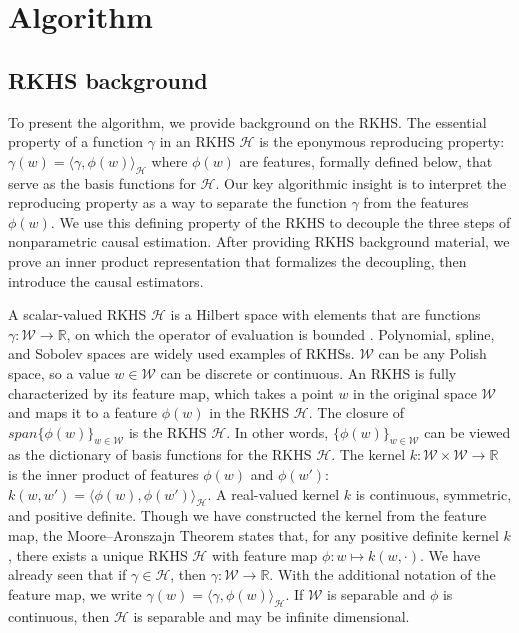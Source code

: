\section{Algorithm}\label{sec:algorithm}

\subsection{RKHS background}

To present the algorithm, we provide background on the RKHS. The essential property of a function $\gamma$ in an RKHS $\mathcal{H}$ is the eponymous reproducing property: $\gamma(w)=\langle \gamma,\phi(w)\rangle_{\mathcal{H}}$ where $\phi(w)$ are features, formally defined below, that serve as the basis functions for $\mathcal{H}$. Our key algorithmic insight is to interpret the reproducing property as a way to separate the function $\gamma$ from the features $\phi(w)$. We use this defining property of the RKHS to decouple the three steps of nonparametric causal estimation. After providing RKHS background material, we prove an inner product representation that formalizes the decoupling, then introduce the causal estimators.

A scalar-valued RKHS $\mathcal{H}$ is a Hilbert space with elements that are functions $\gamma:\mathcal{W}\rightarrow\mathbb{R}$, on which the operator of evaluation is bounded \cite{berlinet2011reproducing}. Polynomial, spline, and Sobolev spaces are widely used examples of RKHSs. $\mathcal{W}$ can be any Polish space, so a value $w\in \mathcal{W}$ can be discrete or continuous. An RKHS is fully characterized by its feature map, which takes a point $w$ in the original space $\mathcal{W}$ and maps it to a feature $\phi(w)$ in the RKHS $\mathcal{H}$. The closure of $span\{\phi(w)\}_{w\in \mathcal{W}}$ is the RKHS $\mathcal{H}$. In other words, $\{\phi(w)\}_{w\in\mathcal{W}}$ can be viewed as the dictionary of basis functions for the RKHS $\mathcal{H}$. The kernel $k:\mathcal{W}\times \mathcal{W}\rightarrow \mathbb{R}$ is the inner product of features $\phi(w)$ and $\phi(w')$: $
k(w,w')=\langle \phi(w),\phi(w') \rangle_{\mathcal{H}}
$. A real-valued kernel $k$ is continuous, symmetric, and positive definite. Though we have constructed the kernel from the feature map, the Moore--Aronszajn Theorem states that, for any positive definite kernel $k$, there exists a unique RKHS $\mathcal{H}$ with feature map $\phi:w\mapsto k(w,\cdot)$. We have already seen that if $\gamma\in\mathcal{H}$, then $\gamma:\mathcal{W}\rightarrow \mathbb{R}$. With the additional notation of the feature map, we write
$
\gamma(w)= \langle \gamma,\phi(w) \rangle_{\mathcal{H}}
$. If $\mathcal{W}$ is separable and $\phi$ is continuous, then $\mathcal{H}$ is separable and may be infinite dimensional.

